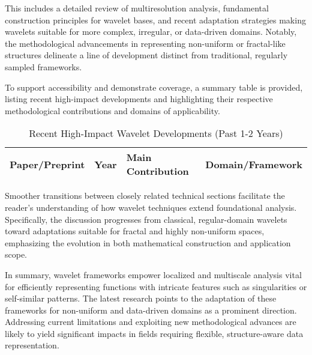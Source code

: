 \documentclass[sigconf]{acmart}
\begin{document}
This includes a detailed review of multiresolution analysis, fundamental construction principles for wavelet bases, and recent adaptation strategies making wavelets suitable for more complex, irregular, or data-driven domains. Notably, the methodological advancements in representing non-uniform or fractal-like structures delineate a line of development distinct from traditional, regularly sampled frameworks.

To support accessibility and demonstrate coverage, a summary table is provided, listing recent high-impact developments and highlighting their respective methodological contributions and domains of applicability.

\begin{table*}[htbp]
\centering
\caption{Recent High-Impact Wavelet Developments (Past 1-2 Years)}
\label{tab:recent_wavelet_work}
\begin{adjustbox}{max width=\textwidth}
\begin{tabular}{@{}llll@{}}
\toprule
\textbf{Paper/Preprint} & \textbf{Year} & \textbf{Main Contribution} & \textbf{Domain/Framework} \\
\midrule
\bottomrule
\end{tabular}
\end{adjustbox}
\end{table*}

Smoother transitions between closely related technical sections facilitate the reader’s understanding of how wavelet techniques extend foundational analysis. Specifically, the discussion progresses from classical, regular-domain wavelets toward adaptations suitable for fractal and highly non-uniform spaces, emphasizing the evolution in both mathematical construction and application scope.

In summary, wavelet frameworks empower localized and multiscale analysis vital for efficiently representing functions with intricate features such as singularities or self-similar patterns. The latest research points to the adaptation of these frameworks for non-uniform and data-driven domains as a prominent direction. Addressing current limitations and exploiting new methodological advances are likely to yield significant impacts in fields requiring flexible, structure-aware data representation.
\end{document}
